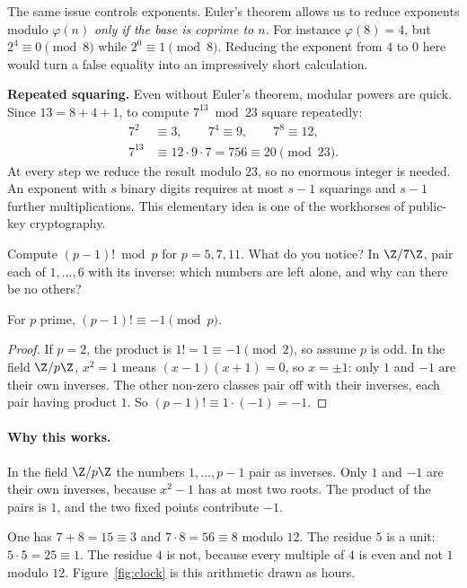 The same issue controls exponents. Euler's theorem allows us to reduce exponents modulo $\varphi(n)$ \emph{only if the base is coprime to $n$}. For instance $\varphi(8)=4$, but $2^4\equiv0\pmod8$ while $2^0\equiv1\pmod8$. Reducing the exponent from $4$ to $0$ here would turn a false equality into an impressively short calculation.

\textbf{Repeated squaring.} Even without Euler's theorem, modular powers are quick. Since $13=8+4+1$, to compute $7^{13}\bmod23$ square repeatedly:
\[
\begin{aligned}
7^2&\equiv3,\qquad 7^4\equiv9,\qquad 7^8\equiv12,\\
7^{13}&\equiv12\cdot9\cdot7=756\equiv20\pmod{23}.
\end{aligned}
\]
At every step we reduce the result modulo $23$, so no enormous integer is needed. An exponent with $s$ binary digits requires at most $s-1$ squarings and $s-1$ further multiplications. This elementary idea is one of the workhorses of public-key cryptography.

\begin{think}
Compute $(p-1)!\bmod p$ for $p=5,7,11$. What do you notice? In $\Z/7\Z$, pair each of $1,\dots,6$ with its inverse: which numbers are left alone, and why can there be no others?
\end{think}

\begin{theorem}[Wilson]\label{thm:wilson}
For $p$ prime, $(p-1)!\equiv-1\pmod p$.
\end{theorem}
\begin{proof}
If $p=2$, the product is $1!=1\equiv-1\pmod2$, so assume $p$ is odd. In the field $\Z/p\Z$, $x^2=1$ means $(x-1)(x+1)=0$, so $x=\pm1$: only $1$ and $-1$ are their own inverses. The other non-zero classes pair off with their inverses, each pair having product $1$. So $(p-1)!\equiv1\cdot(-1)=-1$.
\end{proof}

\paragraph{Why this works.}
In the field $\Z/p\Z$ the numbers $1,\ldots,p-1$ pair as inverses. Only $1$ and $-1$ are their own inverses, because $x^2-1$ has at most two roots. The product of the pairs is $1$, and the two fixed points contribute $-1$.

\begin{examplex}
One has $7+8=15\equiv 3$ and $7\cdot 8=56\equiv 8$ modulo $12$. The residue $5$ is a unit: $5\cdot 5=25\equiv 1$. The residue $4$ is not, because every multiple of $4$ is even and not $1$ modulo $12$. Figure~\ref{fig:clock} is this arithmetic drawn as hours.
\end{examplex}

